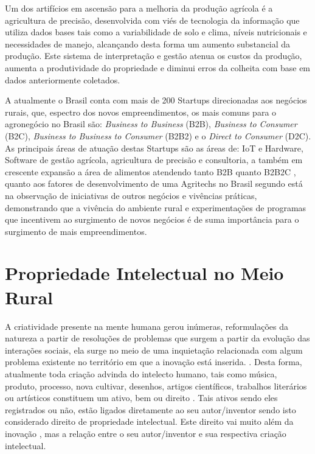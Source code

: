 Um dos artifícios em ascensão para a melhoria da produção agrícola é a agricultura de precisão, desenvolvida com viés de tecnologia da informação que utiliza dados bases tais como a variabilidade de solo e clima, níveis nutricionais e necessidades de manejo, alcançando desta forma um aumento substancial da produção. Este sistema de interpretação e gestão atenua os custos da produção, aumenta a produtividade do propriedade e diminui erros da colheita com base em dados anteriormente coletados.

A atualmente o Brasil conta com mais de 200 Startups direcionadas aos negócios rurais, que, espectro dos novos empreendimentos, os mais comuns para o agronegócio no Brasil são: \textit{Business to Business} (B2B), \textit{Business to Consumer} (B2C), \textit{Business to Business to Consumer} (B2B2) e o \textit{Direct to Consumer} (D2C). As principais áreas de atuação destas Startups são as áreas de: IoT e Hardware, Software de gestão agrícola, agricultura de precisão e consultoria, a também em crescente expansão a área de alimentos atendendo tanto B2B quanto B2B2C \cite{abstartups_startupbase_2019}, quanto aos fatores de desenvolvimento de uma Agritechs no Brasil segundo \cite{mondin_2_2018} está na observação de iniciativas de outros negócios e vivências práticas, demonstrando que a vivência do ambiente rural e experimentações de programas que incentivem ao surgimento de novos negócios é de suma importância para o surgimento de mais empreendimentos.


\section{Propriedade Intelectual no Meio Rural}

A criatividade presente na mente humana gerou inúmeras, reformulações da natureza a partir de resoluções de problemas que surgem a partir da evolução das interações sociais, ela surge no meio de uma inquietação relacionada com algum problema existente no território em que a inovação está inserida. \cite{pacheco_dos_2018}. Desta forma, atualmente toda criação advinda do intelecto humano, tais como música, produto, processo, nova cultivar, desenhos, artigos científicos, trabalhos literários ou artísticos constituem um ativo, bem ou direito \cite{costa_interseccao_2011}. Tais ativos sendo eles registrados ou não, estão ligados diretamente ao seu autor/inventor sendo isto considerado direito de propriedade intelectual. Este direito vai muito além da inovação \cite{wipo_tratado_1970}, mas a relação entre o seu autor/inventor e sua respectiva criação intelectual.

